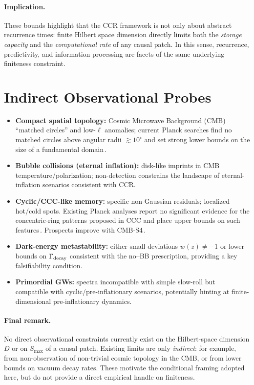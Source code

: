 \documentclass[12pt]{article}
\theoremstyle{remark}
\begin{document}
\paragraph{Implication.}
These bounds highlight that the CCR framework is not only about abstract recurrence
times: finite Hilbert space dimension directly limits both the \emph{storage capacity}
and the \emph{computational rate} of any causal patch. In this sense, recurrence,
predictivity, and information processing are facets of the same underlying finiteness
constraint.


\section{Indirect Observational Probes}
\begin{itemize}[leftmargin=1.2em]
  \item \textbf{Compact spatial topology:} Cosmic Microwave Background (CMB) ``matched circles'' and low-$\ell$ anomalies; current Planck searches find no matched circles above angular radii $\gtrsim 10^{\circ}$ and set strong lower bounds on the size of a fundamental domain\,\cite{CornishSpergelStarkman1998,Planck2016Topology}.
  \item \textbf{Bubble collisions (eternal inflation):} disk-like imprints in CMB temperature/polarization; non-detection constrains the landscape of eternal-inflation scenarios consistent with CCR.
  \item \textbf{Cyclic/CCC-like memory:} specific non-Gaussian residuals; localized hot/cold spots. Existing Planck analyses report no significant evidence for the concentric-ring patterns proposed in CCC and place upper bounds on such features\,\cite{WehusEriksen2011,Planck2015Isotropy}. Prospects improve with CMB-S4\,\cite{CMBS4SB}.
  \item \textbf{Dark-energy metastability:} either small deviations $w(z)\neq -1$ or lower bounds on $\Gamma_{\rm decay}$ consistent with the no--BB prescription, providing a key falsifiability condition.
  \item \textbf{Primordial GWs:} spectra incompatible with simple slow-roll but compatible with cyclic/pre-inflationary scenarios, potentially hinting at finite-dimensional pre-inflationary dynamics.
\end{itemize}

\paragraph{Final remark.}
No direct observational constraints currently exist on the Hilbert-space dimension $D$
or on $S_{\max}$ of a causal patch. Existing limits are only \emph{indirect}: for example,
from non-observation of non-trivial cosmic topology in the CMB, or from lower bounds on
vacuum decay rates. These motivate the conditional framing adopted here, but do not
provide a direct empirical handle on finiteness. 
\end{document}
